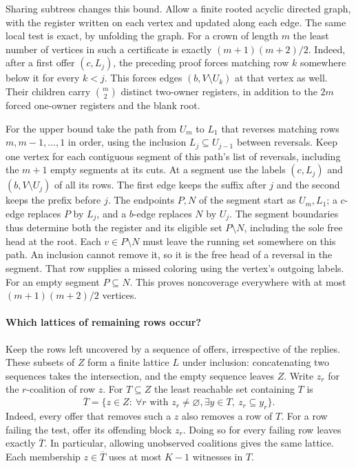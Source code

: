 Sharing subtrees changes this bound. Allow a finite rooted acyclic
directed graph, with the register written on each vertex and updated
along each edge. The same local test is exact, by unfolding the graph.
For a crown of length $m$ the least number of vertices in such a
certificate is exactly $(m+1)(m+2)/2$. Indeed, after a first offer $(c,L_j)$,
the preceding proof forces matching row $k$ somewhere below it for
every $k<j$. This forces edges $(b,V\setminus U_k)$ at that vertex
as well. Their children carry $\binom m2$ distinct two-owner
registers, in addition to the $2m$ forced one-owner registers and
the blank root.

For the upper bound take the path from $U_m$ to $L_1$ that reverses
matching rows $m,m-1,\ldots,1$ in order, using the inclusion
$L_j\subseteq U_{j-1}$ between reversals. Keep one vertex for each
contiguous segment of this path's list of reversals, including the
$m+1$ empty segments at its cuts. At a segment use the labels
$(c,L_j)$ and $(b,V\setminus U_j)$ of all its rows. The first edge
keeps the suffix after $j$ and the second keeps the prefix before $j$.
The endpoints $P,N$ of the segment start as $U_m,L_1$; a $c$-edge
replaces $P$ by $L_j$, and a $b$-edge replaces $N$ by $U_j$.
The segment boundaries thus determine both the register and its
eligible set $P\setminus N$, including the sole free head at the
root. Each $v\in P\setminus N$ must leave the running set somewhere
on this path. An inclusion cannot remove it, so it is the free head
of a reversal in the segment. That row supplies a missed coloring
using the vertex's outgoing labels. For an empty segment $P\subseteq N$.
This proves noncoverage everywhere with at most
$(m+1)(m+2)/2$ vertices.

\paragraph{Which lattices of remaining rows occur?}
Keep the rows left uncovered by a sequence of offers, irrespective of
the replies. These subsets of $Z$ form a finite lattice $L$ under
inclusion: concatenating two sequences takes the intersection, and
the empty sequence leaves $Z$. Write $z_r$ for the $r$-coalition of
row $z$. For $T\subseteq Z$ the least reachable set containing $T$ is
\begin{equation}\label{core:eq:offer-closure}
 \overline T=\{z\in Z:\ \forall r\text{ with }z_r\ne\varnothing,
                 \exists y\in T,\ z_r\subseteq y_r\}.
\end{equation}
Indeed, every offer that removes such a $z$ also removes a row of $T$.
For a row failing the test, offer its offending block $z_r$. Doing so
for every failing row leaves exactly $\overline T$. In particular,
allowing unobserved coalitions gives the same lattice. Each membership
$z\in\overline T$ uses at most $K-1$ witnesses in $T$.

